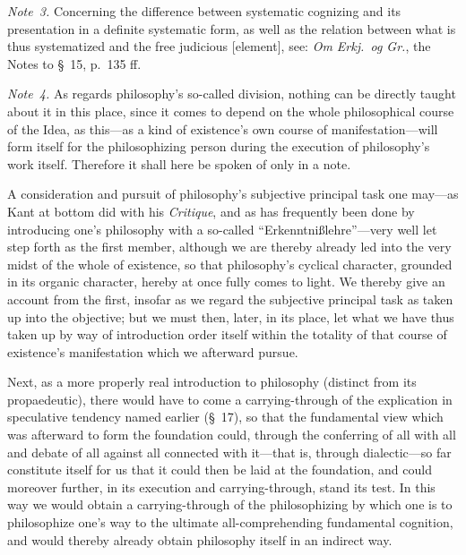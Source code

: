 \documentclass[12pt,a4paper]{book}
\begin{document}
{\small\emph{Note~3.} Concerning the difference between systematic cognizing and its
presentation in a definite systematic form, as well as the relation between what is
thus systematized and the free judicious [element], see: \textit{Om Erkj.\ og Gr.},
the Notes to \S~15, p.~135 ff.\par}

{\small\emph{Note~4.} As regards philosophy's so-called division, nothing can be
directly taught about it in this place, since it comes to depend on the whole
philosophical course of the Idea, as this---as a kind of existence's own course of
manifestation---will form itself for the philosophizing person during the execution
of philosophy's work itself. Therefore it shall here be spoken of only in a note.\par}

{\small A consideration and pursuit of philosophy's subjective principal task one
may---as Kant at bottom did with his \textit{Critique}, and as has frequently been
done by introducing one's philosophy with a so-called ``Erkenntnißlehre''---very well
let step forth as the first member, although we are thereby already led into the very
midst of the whole of existence, so that philosophy's cyclical character, grounded in
its organic character, hereby at once fully comes to light. We thereby give an account
from the first, insofar as we regard the subjective principal task as taken up into
the objective; but we must then, later, in its place, let what we have thus taken up
by way of introduction order itself within the totality of that course of existence's
manifestation which we afterward pursue.\par}

{\small Next, as a more properly real introduction to philosophy (distinct from its
propaedeutic), there would have to come a carrying-through of the explication in
speculative tendency named earlier (\S~17), so that the fundamental view which was
afterward to form the foundation could, through the conferring of all with all and
debate of all against all connected with it---that is, through dialectic---so far
constitute itself for us that it could then be laid at the foundation, and could
moreover further, in its execution and carrying-through, stand its test. In this way
we would obtain a carrying-through of the philosophizing by which one is to
philosophize one's way to the ultimate all-comprehending fundamental cognition, and
would thereby already obtain philosophy itself in an indirect way.\par}
\end{document}
